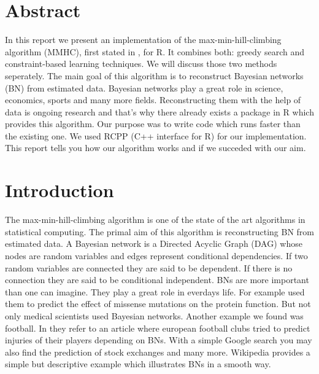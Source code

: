 \pagestyle{useheadings} 

\tableofcontents
\listoffigures

\chapter*{Abstract}

In this report we present an implementation of the max-min-hill-climbing algorithm (MMHC), first stated in \cite{TBA}, for R. It combines both: greedy search and constraint-based learning techniques. We will discuss those two methods seperately. The main goal of this algorithm is to reconstruct Bayesian networks (BN) from estimated data. Bayesian networks play a great role in science, economics, sports and many more fields. Reconstructing them with the help of data is ongoing research and that's why there already exists a package in R which provides this algorithm. Our purpose was to write code which runs faster than the existing one. We used RCPP (C++ interface for R) for our implementation. This report tells you how our algorithm works and if we succeded with our aim.

\chapter{Introduction}

The max-min-hill-climbing algorithm is one of the state of the art algorithms in statistical computing. The primal aim of this algorithm is reconstructing BN from estimated data. A Bayesian network is a Directed Acyclic Graph (DAG) whose nodes are random variables and edges represent conditional dependencies. If two random variables are connected they are said to be dependent. If there is no connection they are said to be conditional independent. BNs are more important than one can imagine. They play a great role in everdays life. For example \cite{NBBCW} used them to predict the effect of missense mutations on the protein function. But not only medical scientists used Bayesian networks. Another example we found was football. In \cite{PKA} they refer to an article where european football clubs tried to predict injuries of their players depending on BNs. With a simple Google search you may also find the prediction of stock exchanges and many more. Wikipedia provides a simple but descriptive example which illustrates BNs in a smooth way.



